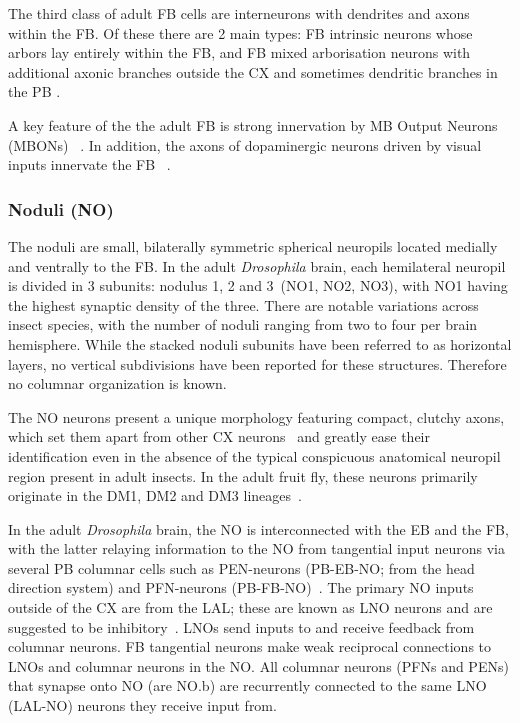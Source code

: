         The third class of adult FB cells are interneurons with dendrites and axons within the FB.
        Of these there are 2 main types: FB intrinsic neurons whose arbors lay entirely within the FB, and FB mixed arborisation neurons with additional axonic branches outside the CX and sometimes dendritic branches in the PB \citep{wolff2015neuroarchitecture}.

        A key feature of the the adult FB is strong innervation by MB Output Neurons (MBONs) ~\citep{scheffer2020connectome, hulse2021connectome}.
        In addition, the axons of dopaminergic neurons driven by visual inputs innervate the FB ~\citep{lin2013comprehensive}.
        \subsubsection{Noduli (NO)}
        The noduli are small, bilaterally symmetric spherical neuropils located medially and ventrally to the FB. In the adult \textit{Drosophila} brain, each hemilateral neuropil is divided in 3 subunits: nodulus 1, 2 and 3~(NO1, NO2, NO3), with NO1 having the highest synaptic density of the three. There are notable variations across insect species, with the number of noduli ranging from two to four per brain hemisphere.
        While the stacked noduli subunits have been referred to as horizontal layers, no vertical subdivisions have been reported for these structures. Therefore no columnar organization is known.

        The NO neurons present a unique morphology featuring compact, clutchy axons, which set them apart from other CX neurons~\citep{wolff2018neuroarchitecture, hulse2021connectome} and greatly ease their identification even in the absence of the typical conspicuous anatomical neuropil region present in adult insects. In the adult fruit fly, these neurons primarily originate in the DM1, DM2 and DM3 lineages~\citep{andrade2019developmentally}.


        In the adult \textit{Drosophila} brain, the NO is interconnected with the EB and the FB, with the latter relaying information to the NO from tangential input neurons via several PB columnar cells such as PEN-neurons (PB-EB-NO; from the head direction system) and PFN-neurons (PB-FB-NO)~\citep{wolff2015neuroarchitecture, hulse2021connectome}.
        The primary NO inputs outside of the CX are from the LAL; these are known as LNO neurons and are suggested to be inhibitory~\citep{wolff2018neuroarchitecture, hulse2021connectome}.
        LNOs send inputs to and receive feedback from columnar neurons. %
        FB tangential neurons make weak reciprocal connections to LNOs and columnar neurons in the NO.
        All columnar neurons (PFNs and PENs) that synapse onto NO (are NO.b) are recurrently connected to the same LNO (LAL-NO) neurons they receive input from. 
